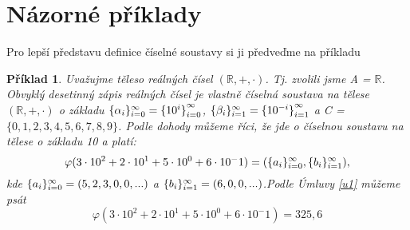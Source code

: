 \documentclass[12pt]{book}
\newtheorem{pr}{Příklad}
\begin{document}
\section{Názorné příklady}
Pro lepší představu definice číselné soustavy si ji předveďme na příkladu
\begin{pr}
	Uvažujme těleso reálných čísel $(\mathbb{R},+,\cdot)$. Tj. zvolili jsme A = $\mathbb{R}$. Obvyklý desetinný zápis reálných čísel je vlastně číselná soustava na tělese $(\mathbb{R},+,\cdot)$ o základu $\{\alpha_i\}_{i=0}^{\infty}=\{{10^i\}}_{i=0}^{\infty}$, $\{\beta_i\}_{i=1}^{\infty}=\{{10^{-i}\}}_{i=1}^{\infty}$ a C = $\{0,1,2,3,4,5,6,7,8,9\}$. Podle dohody můžeme říci, že jde o číselnou soustavu na tělese o základu 10 a platí:
	$$\varphi(3\cdot10^2+2\cdot10^1+5\cdot10^0+6\cdot10^-1)=(\{a_i\}_{i=0}^{\infty},\{b_i\}_{i=1}^{\infty}),$$kde
	$\{a_i\}_{i=0}^{\infty}=(5,2,3,0,0,...)$ a $\{b_i\}_{i=1}^{\infty} = (6,0,0,...)$.\newline Podle Úmluvy \ref{u1} můžeme psát $$\varphi(3\cdot10^2+2\cdot10^1+5\cdot10^0+6\cdot10^-1)=325,6$$
	
	
	
\end{pr}
\end{document}
